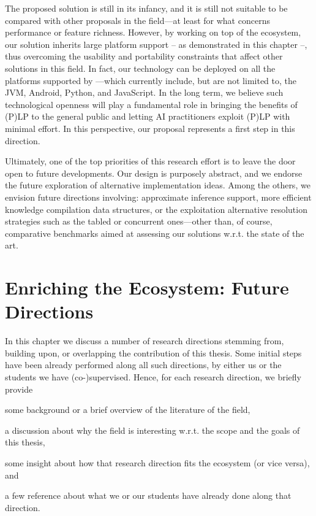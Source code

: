\documentclass[12pt,a4paper,openright,twoside]{book}
\begin{document}
The proposed solution is still in its infancy, and it is still not suitable to be compared with other proposals in the field---at least for what concerns performance or feature richness.
%
However, by working on top of the \twopkt{} ecosystem, our solution inherits large platform support -- as demonstrated in this chapter --, thus overcoming the usability and portability constraints that affect other solutions in this field.
%
In fact, our technology can be deployed on all the platforms supported by \twopkt{}---which currently include, but are not limited to, the JVM, Android, Python, and JavaScript.
%
In the long term, we believe such technological openness will play a fundamental role in bringing the benefits of (P)LP to the general public and letting AI practitioners exploit (P)LP with minimal effort.
%
In this perspective, our proposal represents a first step in this direction.

Ultimately, one of the top priorities of this research effort is to leave the door open to future developments.
%
Our design is purposely abstract, and we endorse the future exploration of alternative implementation ideas.
%
Among the others, we envision future directions involving: approximate inference support, more efficient knowledge compilation data structures, or the exploitation alternative resolution strategies such as the tabled or concurrent ones---other than, of course, comparative benchmarks aimed at assessing our solutions w.r.t. the state of the art.

\chapter{Enriching the Ecosystem: Future Directions}

In this chapter we discuss a number of research directions stemming from, building upon, or overlapping the contribution of this thesis.
%
Some initial steps have been already performed along all such directions, by either us or the students we have (co-)supervised.
%
Hence, for each research direction, we briefly provide
%
\begin{inlinelist}
    \item some background or a brief overview of the literature of the field,
    \item a discussion about why the field is interesting w.r.t. the scope and the goals of this thesis,
    \item some insight about how that research direction fits the \twopkt{} ecosystem (or vice versa), and
    \item a few reference about what we or our students have already done along that direction.
\end{inlinelist}
\end{document}
